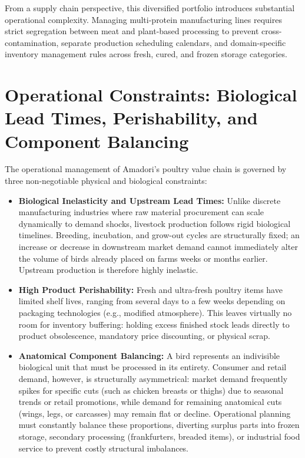 From a supply chain perspective, this diversified portfolio introduces substantial operational complexity. 
Managing multi-protein manufacturing lines requires strict segregation between meat and plant-based processing to prevent cross-contamination, 
separate production scheduling calendars, and domain-specific inventory management rules across fresh, cured, and frozen storage categories.

\section[Operational Constraints]{Operational Constraints: Biological Lead Times, Perishability, and Component Balancing}
\label{sec:operational_constraints}

The operational management of Amadori's poultry value chain is governed by three non-negotiable physical and biological constraints:
\begin{itemize}
    \item \textbf{Biological Inelasticity and Upstream Lead Times:} Unlike discrete manufacturing industries where raw material procurement can 
    scale dynamically to demand shocks, livestock production follows rigid biological timelines. Breeding, incubation, and grow-out cycles are structurally fixed; 
    an increase or decrease in downstream market demand cannot immediately alter the volume of birds already placed on farms weeks or months earlier. 
    Upstream production is therefore highly inelastic.
    \item \textbf{High Product Perishability:} Fresh and ultra-fresh poultry items have limited shelf lives, ranging from several days to a few weeks depending 
    on packaging technologies (e.g., modified atmosphere). This leaves virtually no room for inventory buffering: holding excess finished stock leads directly 
    to product obsolescence, mandatory price discounting, or physical scrap.
    \item \textbf{Anatomical Component Balancing:} A bird represents an indivisible biological unit that must be processed in its entirety. 
    Consumer and retail demand, however, is structurally asymmetrical: market demand frequently spikes for specific cuts (such as chicken breasts or thighs) 
    due to seasonal trends or retail promotions, while demand for remaining anatomical cuts (wings, legs, or carcasses) may remain flat or decline. 
    Operational planning must constantly balance these proportions, diverting surplus parts into frozen storage, secondary processing (frankfurters, breaded items), 
    or industrial food service to prevent costly structural imbalances.
\end{itemize}

